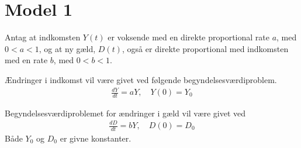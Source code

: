 \section{Model 1}
Antag at indkomsten $Y(t)$ er voksende med en direkte proportional rate $a$, med $0<a<1$, og at ny gæld, $D(t)$, også er direkte proportional med indkomsten med en rate $b$, med $0 < b < 1$. 

Ændringer i indkomst vil være givet ved følgende begyndelsesværdiproblem.
\begin{align}
    \frac{dY}{dt} = aY, \quad Y(0) = Y_0
\end{align}

Begyndelsesværdiproblemet for ændringer i gæld vil være givet ved
\begin{align}
    \frac{dD}{dt} = bY, \quad D(0) = D_0
\end{align}
Både $Y_0$ og $D_0$ er givne konstanter. 



